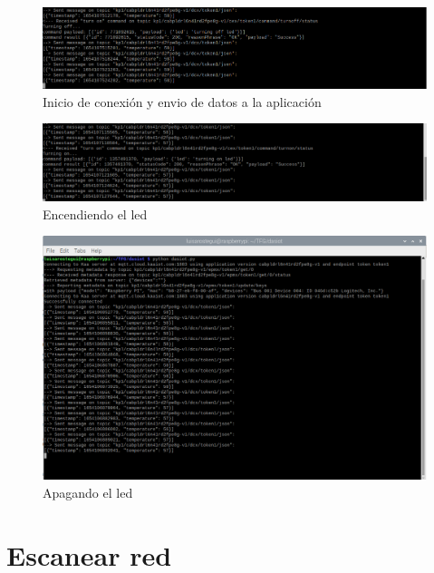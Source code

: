 \begin{figure}[p]
    \centering
    \includegraphics[width=\linewidth]{imagenes/2022-06-01-201846_1920x1080_scrot.png}
    \caption{Inicio de conexión y envio de datos a la aplicación}
    \label{fig:figure16}
\end{figure}

\begin{figure}[p]
    \centering
    \includegraphics[width=\linewidth]{imagenes/2022-06-01-201209_1920x1080_scrot.png}
    \caption{Encendiendo el led}
    \label{fig:figure17}
\end{figure}

\begin{figure}[p]
    \centering
    \includegraphics[width=\linewidth]{imagenes/2022-06-01-200813_1920x1080_scrot.png}
    \caption{Apagando el led}
    \label{fig:figure18}
\end{figure}

\newpage

\section{Escanear red}

